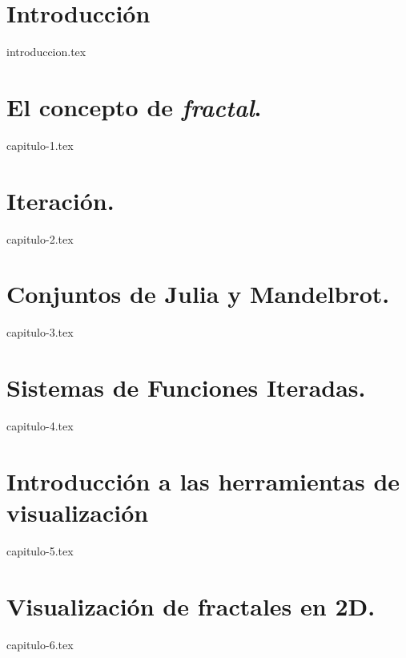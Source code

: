 \documentclass[11pt]{report}
\begin{document}

\chapter*{Introducción}
\setcounter{page}{1}


{introduccion.tex}


\chapter{El concepto de \textit{fractal}.}
\label{chap:concepto}

{capitulo-1.tex}

\chapter{Iteración.}
\label{chap:iteracion}

{capitulo-2.tex}


\chapter{Conjuntos de Julia y Mandelbrot.}
\label{chap:Julia-Mandelbrot}

{capitulo-3.tex}

\chapter{Sistemas de Funciones Iteradas.}
\label{chap:SFI}

{capitulo-4.tex}

\chapter{Introducción a las herramientas de visualización}
\label{chap:visualizacion}

{capitulo-5.tex}

\chapter{Visualización de fractales en 2D.}
\label{chap:fractales-2D}

{capitulo-6.tex}
\end{document}

